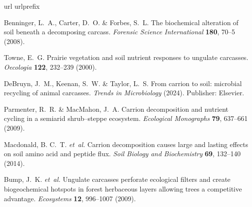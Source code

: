 \documentclass[
  sn-nature,
  lineno, referee]{sn-jnl}
\begin{document}
\renewcommand{\bibsection}{}
\begin{thebibliography}{10}
  \expandafter\ifx\csname url\endcsname\relax
    \def\url#1{\burl{#1}}\fi
  \expandafter\ifx\csname urlprefix\endcsname\relax\def\urlprefix{URL }\fi
  \providecommand{\bibinfo}[2]{#2}
  \providecommand{\eprint}[2][]{\url{#2}}
  \providecommand{\doi}[1]{\url{https://doi.org/#1}}
  \bibcommenthead
  
  \bibinfo{author}{Benninger, L.~A.}, \bibinfo{author}{Carter, D.~O.} \& \bibinfo{author}{Forbes, S.~L.}
  \newblock \bibinfo{title}{The biochemical alteration of soil beneath a decomposing carcass}.
  \newblock \emph{\bibinfo{journal}{Forensic Science International}} \textbf{\bibinfo{volume}{180}}, \bibinfo{pages}{70--5} (\bibinfo{year}{2008}).
  
  \bibinfo{author}{Towne, E.~G.}
  \newblock \bibinfo{title}{Prairie vegetation and soil nutrient responses to ungulate carcasses}.
  \newblock \emph{\bibinfo{journal}{Oecologia}} \textbf{\bibinfo{volume}{122}}, \bibinfo{pages}{232--239} (\bibinfo{year}{2000}).
  
  \bibinfo{author}{DeBruyn, J.~M.}, \bibinfo{author}{Keenan, S.~W.} \& \bibinfo{author}{Taylor, L.~S.}
  \newblock \bibinfo{title}{From carrion to soil: microbial recycling of animal carcasses}.
  \newblock \emph{\bibinfo{journal}{Trends in Microbiology}}  (\bibinfo{year}{2024}).
  \newblock \bibinfo{note}{Publisher: Elsevier}.
  
  \bibinfo{author}{Parmenter, R.~R.} \& \bibinfo{author}{MacMahon, J.~A.}
  \newblock \bibinfo{title}{Carrion decomposition and nutrient cycling in a semiarid shrub–steppe ecosystem}.
  \newblock \emph{\bibinfo{journal}{Ecological Monographs}} \textbf{\bibinfo{volume}{79}}, \bibinfo{pages}{637--661} (\bibinfo{year}{2009}).
  
  \bibinfo{author}{Macdonald, B. C.~T.} \emph{et~al.}
  \newblock \bibinfo{title}{Carrion decomposition causes large and lasting effects on soil amino acid and peptide flux}.
  \newblock \emph{\bibinfo{journal}{Soil Biology and Biochemistry}} \textbf{\bibinfo{volume}{69}}, \bibinfo{pages}{132--140} (\bibinfo{year}{2014}).
  
  \bibinfo{author}{Bump, J.~K.} \emph{et~al.}
  \newblock \bibinfo{title}{Ungulate carcasses perforate ecological filters and create biogeochemical hotspots in forest herbaceous layers allowing trees a competitive advantage}.
  \newblock \emph{\bibinfo{journal}{Ecosystems}} \textbf{\bibinfo{volume}{12}}, \bibinfo{pages}{996--1007} (\bibinfo{year}{2009}).
  

\end{thebibliography}
\end{document}
